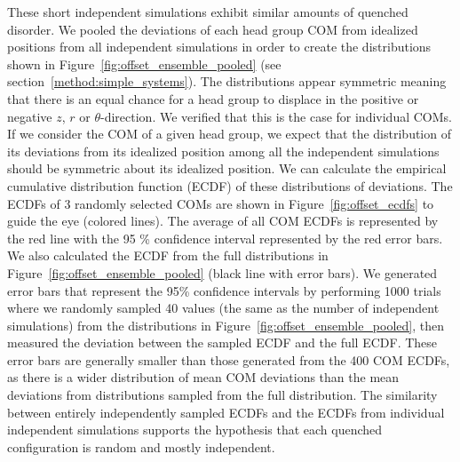 \documentclass[journal=jpcbfk,manuscript=article]{achemso}
\begin{document}
  These short independent simulations exhibit similar amounts of quenched disorder. 
  We pooled the deviations of each head group COM from idealized positions
  from all independent simulations in order to create the distributions shown in 
  Figure~\ref{fig:offset_ensemble_pooled} 
  (see section~\ref{method:simple_systems}). The distributions appear 
  symmetric meaning that there is an equal chance for a head group to displace
  in the positive or negative $z$, $r$ or $\theta$-direction. We verified that
  this is the case for individual COMs. 
  If we consider the COM of a given head group, we expect that the
  distribution of its deviations from its idealized position among all the 
  independent simulations
  should be symmetric about its idealized position. We can calculate the 
  empirical cumulative distribution function (ECDF) 
  of these distributions of deviations. 
  The ECDFs of 3 randomly selected COMs
  are shown in Figure~\ref{fig:offset_ecdfs} to guide the eye (colored lines). The average 
  of all COM ECDFs is represented by the red line with the 95 \% confidence
  interval represented by the red error bars. We also calculated 
  the ECDF from the full distributions in Figure~\ref{fig:offset_ensemble_pooled}
  (black line with error bars). We generated error bars that represent the 95\% 
  confidence intervals by performing 1000 trials where we randomly sampled 40
  values (the same as the number of independent simulations) from the distributions in 
  Figure~\ref{fig:offset_ensemble_pooled}, then measured the deviation between
  the sampled ECDF and the full ECDF. These error bars are generally smaller than
  those generated from the 400 COM ECDFs, as there is a wider
  distribution of mean COM deviations than the mean deviations from distributions
  sampled from the full distribution. The similarity between entirely independently
  sampled ECDFs and the ECDFs from individual independent simulations supports 
  the hypothesis that each quenched configuration is random and mostly independent.
  
\end{document}

